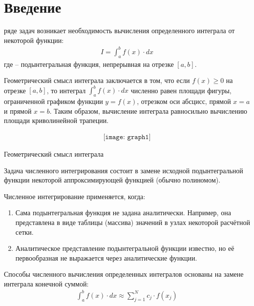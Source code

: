 \documentclass{report}
\begin{document}
\setcounter{page}{2}

\tableofcontents
\newpage

\section*{Введение}
 ряде задач возникает необходимость вычисления определенного интеграла от некоторой функции:
\begin{align*}
    I = \int_{a}^{b}f(x)\cdot dx
\end{align*}
где  – подынтегральная функция, непрерывная на отрезке $[a,b]$.
     
\par Геометрический смысл интеграла заключается в том, что если $f(x)\ge 0$ на отрезке $[a,b]$, то интеграл $\int_{a}^{b}f(x)\cdot dx$ численно равен площади фигуры, ограниченной графиком функции $y=f(x)$, отрезком оси абсцисс, прямой $x = a$ и прямой $x = b$. Таким образом, вычисление интеграла равносильно вычислению площади криволинейной трапеции.

\begin{align*}
    \texttt{[image: graph1]}
\end{align*}
\begin{center}
    \caption{Геометрический смысл интеграла}
\end{center}

\par Задача численного интегрирования состоит в замене исходной подынтегральной функции некоторой аппроксимирующей функцией (обычно полиномом).
\par Численное интегрирование применяется, когда:
\begin{enumerate}
    \item Сама подынтегральная функция не задана аналитически. Например, она представлена в виде таблицы (массива) значений в узлах некоторой расчётной сетки.
    \item Аналитическое представление подынтегральной функции известно, но её первообразная не выражается через аналитические функции.
\end{enumerate}

Способы численного вычисления определенных интегралов основаны на замене интеграла конечной суммой:
\begin{align*}
    \int_{a}^{b}f(x)\cdot dx \approx \sum_{j=1}^{N}c_{j} \cdot f(x_{j})
\end{align*}
\end{document}
